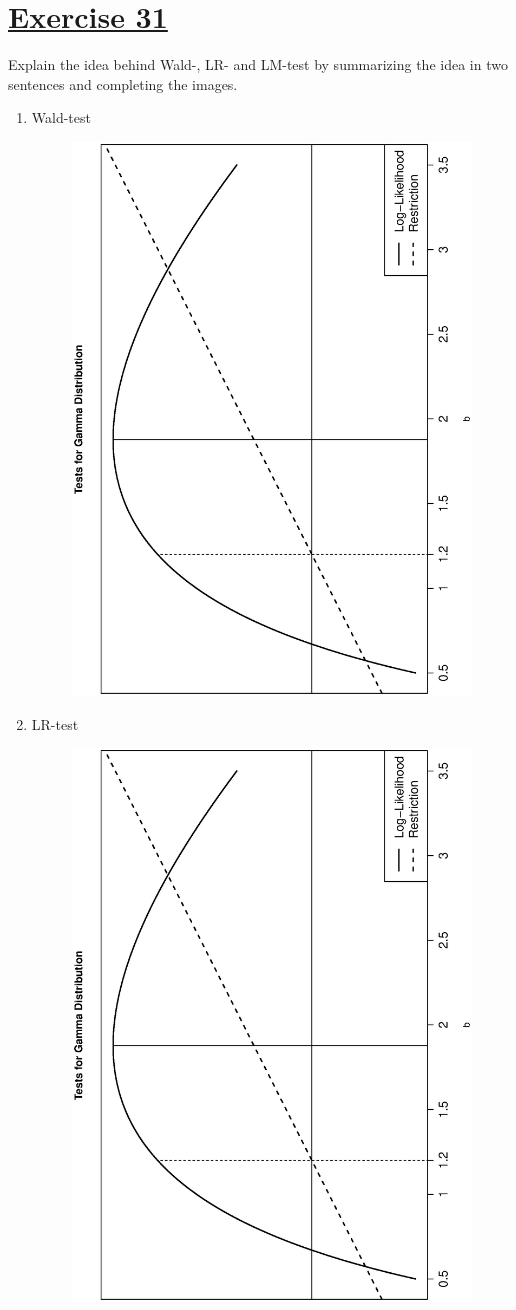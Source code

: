 \documentclass[captions=tableheading, 12pt, headings=small, parskip=half]{scrartcl}
\begin{document}
\section*{\underline{Exercise 31}}
Explain the idea behind Wald-, LR- and LM-test by summarizing the idea in two sentences and completing the images.
\begin{enumerate}[label = \alph*)]
	\item Wald-test
	\begin{figure}[H]
		\centering
		\includegraphics[height = 0.75\columnwidth, angle = -90]{Code1/Gamma_Wald_LR.eps}
	\end{figure}
	\item LR-test
\begin{figure}[H]
	\centering
	\includegraphics[height = 0.75\columnwidth, angle = -90]{Code1/Gamma_Wald_LR.eps}

\end{figure}
\end{enumerate}
\end{document}
